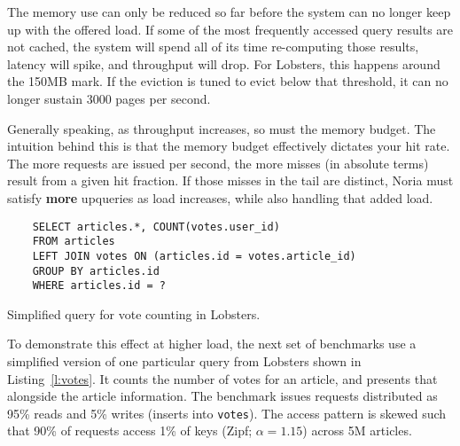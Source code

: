 %

The memory use can only be reduced so far before the system can no longer keep
up with the offered load. If some of the most frequently accessed query results
are not cached, the system will spend all of its time re-computing those
results, latency will spike, and throughput will drop. For Lobsters, this
happens around the 150MB mark. If the eviction is tuned to evict below that
threshold, it can no longer sustain 3000 pages per second.

Generally speaking, as throughput increases, so must the memory budget. The
intuition behind this is that the memory budget effectively dictates your hit
rate. The more requests are issued per second, the more misses (in absolute
terms) result from a given hit fraction. If those misses in the tail are
distinct, Noria must satisfy \textbf{more} upqueries as load increases, while
also handling that added load.

\begin{listing}[h]
  \begin{verbatim}
    SELECT articles.*, COUNT(votes.user_id)
    FROM articles
    LEFT JOIN votes ON (articles.id = votes.article_id)
    GROUP BY articles.id
    WHERE articles.id = ?
  \end{verbatim}
  \caption{Simplified query for vote counting in Lobsters.}
  \label{l:votes}
\end{listing}

To demonstrate this effect at higher load, the next set of benchmarks use a
simplified version of one particular query from Lobsters shown in
Listing~\ref{l:votes}. It counts the number of votes for an article, and
presents that alongside the article information. The benchmark issues requests
distributed as 95\% reads and 5\% writes (inserts into \texttt{votes}). The
access pattern is skewed such that 90\% of requests access 1\% of keys (Zipf;
$\alpha = 1.15$) across 5M articles.

